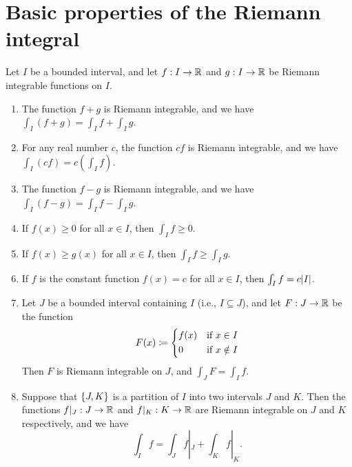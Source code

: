 \section{Basic properties of the Riemann integral}\label{sec:11.4}

\begin{thm}\label{11.4.1}
  Let \(I\) be a bounded interval, and let \(f : I \to \mathbb{R}\) and \(g : I \to \mathbb{R}\) be Riemann integrable functions on \(I\).
  \begin{enumerate}
    \item The function \(f + g\) is Riemann integrable, and we have \(\int_I (f + g) = \int_I f + \int_I g\).
    \item For any real number \(c\), the function \(cf\) is Riemann integrable, and we have \(\int_I (cf) = c(\int_I f)\).
    \item The function \(f - g\) is Riemann integrable, and we have \(\int_I (f - g) = \int_I f - \int_I g\).
    \item If \(f(x) \geq 0\) for all \(x \in I\), then \(\int_I f \geq 0\).
    \item If \(f(x) \geq g(x)\) for all \(x \in I\), then \(\int_I f \geq \int_I g\).
    \item If \(f\) is the constant function \(f(x) = c\) for all \(x \in I\), then \(\int_I f = c \abs{I}\).
    \item Let \(J\) be a bounded interval containing \(I\) (i.e., \(I \subseteq J\)), and let \(F : J \to \mathbb{R}\) be the function
          \[
            F(x) \coloneqq \begin{dcases}
              f(x) & \text{if } x \in I    \\
              0    & \text{if } x \notin I \\
            \end{dcases}
          \]
          Then \(F\) is Riemann integrable on \(J\), and \(\int_J F = \int_I f\).
    \item Suppose that \(\left\lbrace J, K\right\rbrace\) is a partition of \(I\) into two intervals \(J\) and \(K\).
          Then the functions \(f|_J : J \to \mathbb{R}\) and \(f|_K : K \to \mathbb{R}\) are Riemann integrable on \(J\) and \(K\) respectively, and we have
          \[
            \int_I f = \int_J f|_J + \int_K f|_K.
          \]
  \end{enumerate}
\end{thm}

